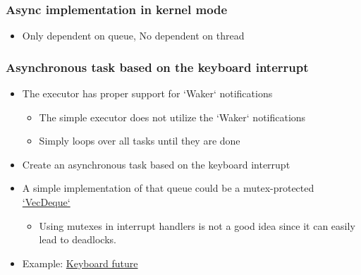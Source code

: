 \begin{frame}[fragile]
    \frametitle{Async implementation in kernel mode}
% 
% 
% 
% 
% 
% 
% 
    \begin{itemize}
        \item Only dependent on queue, No dependent on thread
    \end{itemize}

\end{frame}
\begin{frame}[fragile]
    \frametitle{Asynchronous task based on the keyboard interrupt}
% 
% 
    \begin{itemize}
        \item The executor has proper support for `Waker` notifications
    	\begin{itemize}
    	    \item The simple executor does not utilize the `Waker` notifications
    	    \item Simply loops over all tasks until they are done
    	\end{itemize}

        \item Create an asynchronous task based on the keyboard interrupt
% 

        \item A simple implementation of that queue could be a mutex-protected \href{https://doc.rust-lang.org/stable/alloc/collections/vec_deque/struct.VecDeque.html}{`VecDeque`}
    	\begin{itemize}
    	    \item Using mutexes in interrupt handlers is not a good idea since it can easily lead to deadlocks.
    	\end{itemize}

        \item Example: \href{https://github.com/phil-opp/blog_os/blob/post-12/src/task/keyboard.rs}{Keyboard future}
    \end{itemize}

\end{frame}
